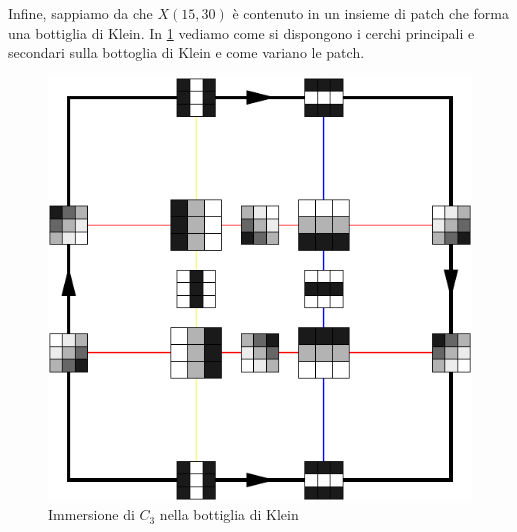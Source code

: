 Infine, sappiamo da \cite{Carlsson2008} che $X(15,30)$ è contenuto in un insieme di patch che forma una bottiglia di Klein. In \cref{fig:kleinpatch} vediamo come si dispongono i cerchi principali e secondari sulla bottoglia di Klein e come variano le patch.

\begin{figure}[ht]
  \begin{center}
    \includegraphics[width=.6\linewidth]{gfx/kleinpatches.pdf}
    \caption{Immersione di $C_3$ nella bottiglia di Klein}
    \label{fig:kleinpatch}
  \end{center}
\end{figure}
